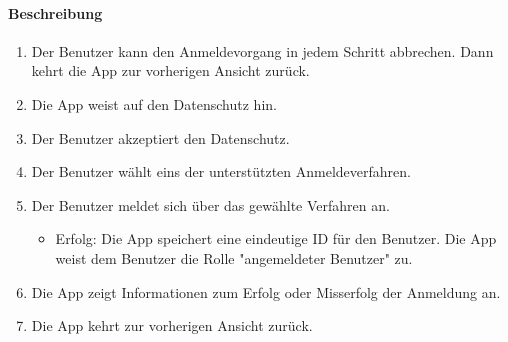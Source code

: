 \paragraph{Beschreibung}
\begin{enumerate}
      \item Der Benutzer kann den Anmeldevorgang in jedem Schritt abbrechen. Dann kehrt die App zur vorherigen Ansicht zurück.
      \item Die App weist auf den Datenschutz hin.
      \item Der Benutzer akzeptiert den Datenschutz.
      \item Der Benutzer wählt eins der unterstützten Anmeldeverfahren.
      \item Der Benutzer meldet sich über das gewählte Verfahren an.
            \begin{itemize}
                  \item{Erfolg:} Die App speichert eine eindeutige ID für den Benutzer. Die App weist dem Benutzer die Rolle "angemeldeter Benutzer" zu.
            \end{itemize}
      \item Die App zeigt Informationen zum Erfolg oder Misserfolg der Anmeldung an.
      \item Die App kehrt zur vorherigen Ansicht zurück. 
\end{enumerate}